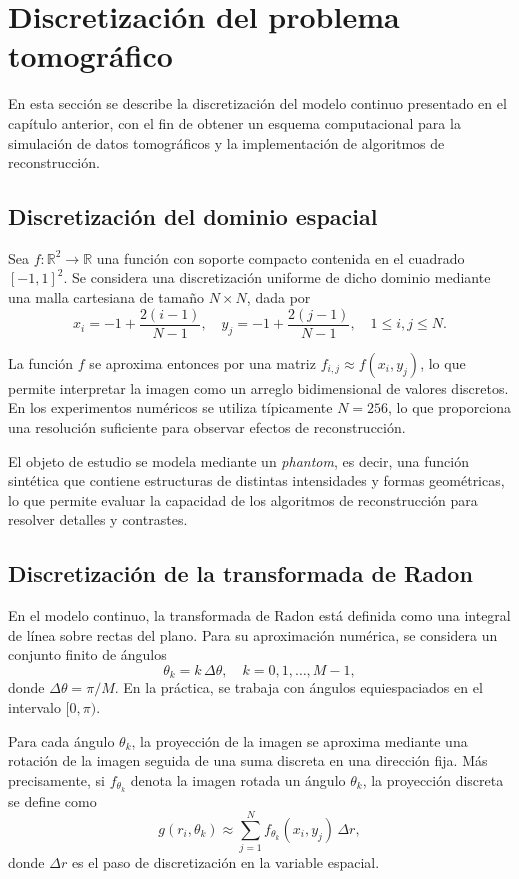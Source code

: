 \section{Discretización del problema tomográfico}

En esta sección se describe la discretización del modelo continuo presentado en el capítulo anterior, con el fin de obtener un esquema computacional para la simulación de datos tomográficos y la implementación de algoritmos de reconstrucción.

\subsection*{Discretización del dominio espacial}

Sea $f : \mathbb{R}^{2} \to \mathbb{R}$ una función con soporte compacto contenida en el cuadrado $[-1,1]^{2}$. Se considera una discretización uniforme de dicho dominio mediante una malla cartesiana de tamaño $N \times N$, dada por
\[
x_i = -1 + \frac{2(i-1)}{N-1}, \quad y_j = -1 + \frac{2(j-1)}{N-1}, \quad 1 \leq i,j \leq N.
\]

La función $f$ se aproxima entonces por una matriz $f_{i,j} \approx f(x_i,y_j)$, lo que permite interpretar la imagen como un arreglo bidimensional de valores discretos. En los experimentos numéricos se utiliza típicamente $N=256$, lo que proporciona una resolución suficiente para observar efectos de reconstrucción.

El objeto de estudio se modela mediante un \emph{phantom}, es decir, una función sintética que contiene estructuras de distintas intensidades y formas geométricas, lo que permite evaluar la capacidad de los algoritmos de reconstrucción para resolver detalles y contrastes.

\subsection*{Discretización de la transformada de Radon}

En el modelo continuo, la transformada de Radon está definida como una integral de línea sobre rectas del plano. Para su aproximación numérica, se considera un conjunto finito de ángulos
\[
\theta_k = k\,\Delta \theta, \quad k = 0,1,\dots,M-1,
\]
donde $\Delta \theta = \pi/M$. En la práctica, se trabaja con ángulos equiespaciados en el intervalo $[0,\pi)$.

Para cada ángulo $\theta_k$, la proyección de la imagen se aproxima mediante una rotación de la imagen seguida de una suma discreta en una dirección fija. Más precisamente, si $f_{\theta_k}$ denota la imagen rotada un ángulo $\theta_k$, la proyección discreta se define como
\[
g(r_i,\theta_k) \approx \sum_{j=1}^{N} f_{\theta_k}(x_i,y_j)\,\Delta r,
\]
donde $\Delta r$ es el paso de discretización en la variable espacial.

